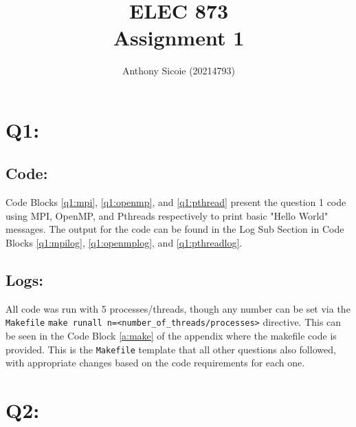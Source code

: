 \documentclass[11pt]{article}
\title{%
  ELEC 873 \\
Assignment 1}
\author{Anthony Sicoie (20214793)}
\begin{document}
\maketitle


\section*{Q1:}

\subsection*{Code:}

Code Blocks \ref{q1:mpi}, \ref{q1:openmp}, and \ref{q1:pthread} present the question 1 code using MPI, OpenMP, and Pthreads respectively to print basic "Hello World" messages.
The output for the code can be found in the Log Sub Section in Code Blocks \ref{q1:mpilog}, \ref{q1:openmplog}, and \ref{q1:pthreadlog}.





\subsection*{Logs:}
All code was run with 5 processes/threads, though any number can be set via the \texttt{Makefile} \texttt{make runall n=<number\_of\_threads/processes>} directive. 
This can be seen in the Code Block \ref{a:make} of the appendix where the makefile code is provided.
This is the \texttt{Makefile} template that all other questions also followed, with appropriate changes based on the code requirements for each one.





\section*{Q2:}
\end{document}
